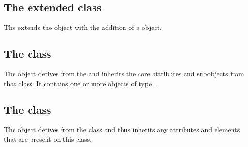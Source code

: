 \subsection{The extended  class}
\label{extended-species-class}




The \FooPackage extends the  object with the addition of
a \ListOfBananas object.

\subsection{The  class}
\label{listofbananas-class}


The \ListOfBananas object derives from the  and inherits
the core attributes and subobjects from that class. It contains one or
more objects of type \Banana.

\subsection{The  class}
\label{banana-class}




The \Banana object derives from the \SBase class and thus inherits any
attributes and elements that are present on this class.
